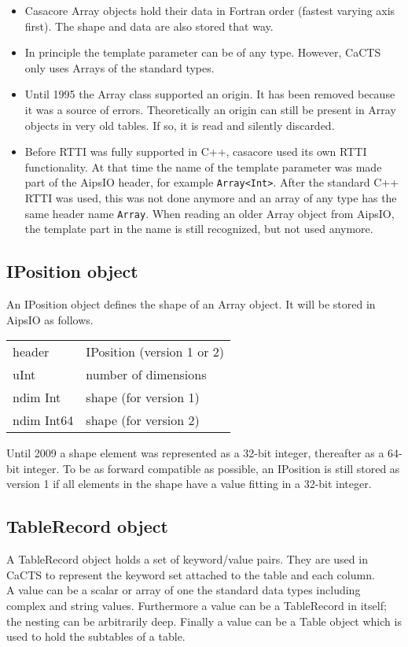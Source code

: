 \begin {itemize}
\item Casacore Array objects hold their data in Fortran order (fastest
  varying axis first). The shape and data are also stored that way.
\item In principle the template parameter can be of any
  type. However, CaCTS only uses Arrays of the standard types.
\item Until 1995 the Array class supported an origin. It has been
  removed because it was a
  source of errors. Theoretically an origin can still be present in
  Array objects in very old tables. If so, it is read and silently discarded.
\item Before RTTI was fully supported in C++, casacore used its
  own RTTI functionality. At that time the name of the template
  parameter was made part of the AipsIO header, for example
  \texttt{Array<Int>}. After the standard C++ RTTI was used, this was
  not done anymore and an array of any type has the same header name
  \texttt{Array}. When reading an older Array object from AipsIO, the
  template part in the name is still recognized, but not used anymore.
\end {itemize}

\subsection{IPosition object}
An IPosition object defines the shape of an Array object.
It will be stored in AipsIO as follows.

\vspace{0.15in}
\begin{tabular}{|l|p{13cm}|} \hline
  header & IPosition (version 1 or 2) \\
  uInt & number of dimensions \\
  ndim Int & shape (for version 1) \\
  ndim Int64 & shape (for version 2) \\
  \hline
\end{tabular}
\vspace{0.15in}

Until 2009 a shape element was represented as a 32-bit integer,
thereafter as a 64-bit integer. To be as forward compatible as
possible, an IPosition is still stored as version 1 if all elements in
the shape have a value fitting in a 32-bit integer.
 
\subsection{TableRecord object}
A TableRecord object holds a set of keyword/value pairs. They are used
in CaCTS to represent the keyword set attached to the table and each column.
\\A value can be a scalar or array of one the standard data types including
complex and string values. Furthermore a value can be a TableRecord in
itself; the nesting can be arbitrarily deep. Finally a value can be
a Table object which is used to hold the subtables of a table.

